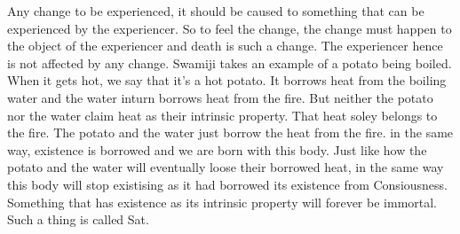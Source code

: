 \documentclass{article}
\begin{document}
\begin{oframed}

    Any change to be experienced, it should be caused to something that can be
    experienced by the experiencer. So to feel the change, the change must
    happen to the object of the experiencer and death is such a change. The
    experiencer hence is not affected by any change.  Swamiji takes an example
    of a potato being boiled. When it gets hot, we say that it's a hot potato.
    It borrows heat from the boiling water and the water inturn borrows heat
    from the fire. But neither the potato nor the water claim heat as their
    intrinsic property. That heat soley belongs to the fire. The potato and the
    water just borrow the heat from the fire. in the same way, existence is
    borrowed and we are born with this body. Just like how the potato and the
    water will eventually loose their borrowed heat, in the same way this body
    will stop existising as it had borrowed its existence from Consiousness.
    Something that has existence as its intrinsic property will forever be
    immortal. Such a thing is called Sat.

\end{oframed}
\end{document}
